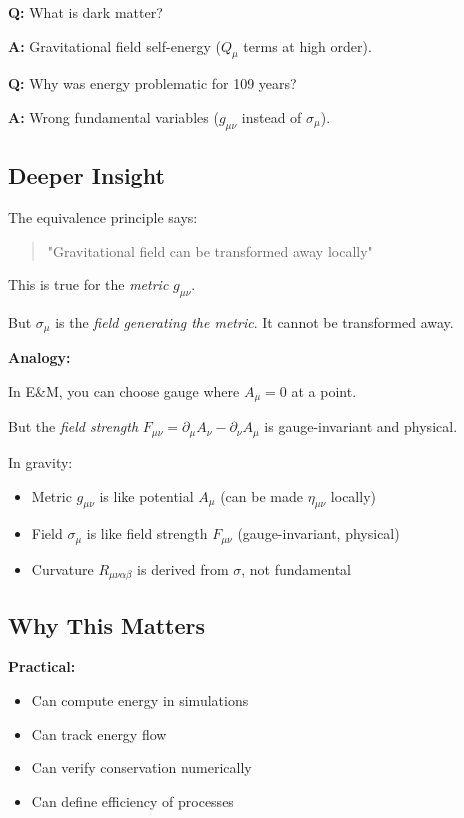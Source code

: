 \documentclass[11pt,a4paper]{article}
\theoremstyle{definition}
\theoremstyle{remark}
\begin{document}
		\textbf{Q:} What is dark matter?
		
		\textbf{A:} Gravitational field self-energy ($Q_\mu$ terms at high order).
		
		\textbf{Q:} Why was energy problematic for 109 years?
		
		\textbf{A:} Wrong fundamental variables ($g_{\mu\nu}$ instead of $\sigma_\mu$).
	
	\subsection{Deeper Insight}
	
	The equivalence principle says:
	\begin{quote}
		"Gravitational field can be transformed away locally"
	\end{quote}
	
	This is true for the \emph{metric} $g_{\mu\nu}$.
	
	But $\sigma_\mu$ is the \emph{field generating the metric}. It cannot be transformed away.
	
	\textbf{Analogy:}
	
	In E\&M, you can choose gauge where $A_\mu = 0$ at a point.
	
	But the \emph{field strength} $F_{\mu\nu} = \partial_\mu A_\nu - \partial_\nu A_\mu$ is gauge-invariant and physical.
	
	In gravity:
	\begin{itemize}
		\item Metric $g_{\mu\nu}$ is like potential $A_\mu$ (can be made $\eta_{\mu\nu}$ locally)
		\item Field $\sigma_\mu$ is like field strength $F_{\mu\nu}$ (gauge-invariant, physical)
		\item Curvature $R_{\mu\nu\alpha\beta}$ is derived from $\sigma$, not fundamental
	\end{itemize}
	
	\subsection{Why This Matters}
	
	\textbf{Practical:}
	\begin{itemize}
		\item Can compute energy in simulations
		\item Can track energy flow
		\item Can verify conservation numerically
		\item Can define efficiency of processes
	\end{itemize}
	
\end{document}
